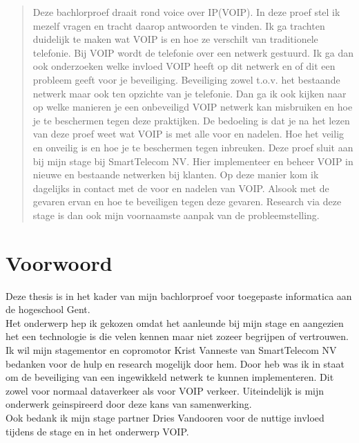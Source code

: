 \documentclass[pdftex,a4paper,12pt,twoside]{report}
\begin{document}
\begin{abstract}

Deze bachlorproef draait rond voice over IP(VOIP). In deze proef stel ik mezelf vragen en tracht daarop antwoorden te vinden. Ik ga trachten duidelijk te maken wat VOIP is en hoe ze verschilt van traditionele telefonie. Bij VOIP wordt de telefonie over een netwerk gestuurd. Ik ga dan ook onderzoeken welke invloed VOIP heeft op dit netwerk en of dit een probleem geeft voor je beveiliging. Beveiliging zowel t.o.v. het bestaande netwerk maar ook ten opzichte van je telefonie. Dan ga ik ook kijken naar op welke manieren je een onbeveiligd VOIP netwerk kan misbruiken en hoe je te beschermen tegen deze praktijken. De bedoeling is dat je na het lezen van deze proef weet wat VOIP is met alle voor en nadelen. Hoe het veilig en onveilig is en hoe je te beschermen tegen inbreuken. Deze proef sluit aan bij mijn stage bij SmartTelecom NV. Hier implementeer en beheer VOIP in nieuwe en bestaande netwerken bij klanten. Op deze manier kom ik dagelijks in contact met de voor en nadelen van VOIP. Alsook met de gevaren ervan en hoe te beveiligen tegen deze gevaren. Research via deze stage is dan ook mijn voornaamste aanpak van de probleemstelling.
 
\end{abstract}

\chapter*{Voorwoord}
\label{ch:voorwoord}
Deze thesis is in het kader van mijn bachlorproef voor toegepaste informatica aan de hogeschool Gent.\\
Het onderwerp hep ik gekozen omdat het aanleunde bij mijn stage en aangezien het een technologie is die velen kennen maar niet zozeer begrijpen of vertrouwen. 
Ik wil mijn stagementor en copromotor Krist Vanneste van SmartTelecom NV bedanken voor de hulp en research mogelijk door hem. Door heb was ik in staat om de beveiliging van een ingewikkeld netwerk te kunnen implementeren. Dit zowel voor normaal dataverkeer als voor VOIP verkeer. Uiteindelijk is mijn onderwerk geinspireerd door deze kans van samenwerking.\\
Ook bedank ik mijn stage partner Dries Vandooren voor de nuttige invloed tijdens de stage en in het onderwerp VOIP.
\end{document}
